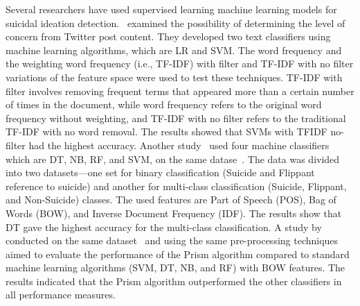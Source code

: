 \documentclass[sn-mathphys,Numbered]{sn-jnl}%
\begin{document}
Several researchers have used supervised learning machine learning models for suicidal ideation detection.~\citet{word2ODEA2015183} examined the possibility of determining the level of concern from Twitter post content. They developed two text classifiers using machine learning algorithms, which are LR and SVM. The word frequency and the weighting word frequency (i.e., TF-IDF) with filter and TF-IDF with no filter variations of the feature space were used to test these techniques. TF-IDF with filter involves removing frequent terms that appeared more than a certain number of times in the document, while word frequency refers to the original word frequency without weighting, and TF-IDF with no filter refers to the traditional TF-IDF with no word removal. The results showed that SVMs with TFIDF no-filter had the highest accuracy. Another study~\cite{33n8527039} used four machine classifiers which are DT, NB, RF, and SVM, on the same datase~\cite{32n10.1145/2700171.2791023}. The data was divided into two datasets—one set for binary classification (Suicide and Flippant reference to suicide) and another for multi-class classification (Suicide, Flippant, and Non-Suicide) classes. The used features are Part of Speech (POS), Bag of Words (BOW), and Inverse Document Frequency (IDF). The results show that DT gave the highest accuracy for the multi-class classification. 
A study by~\citet{26chiroma2018suiciderelated} conducted on the same dataset~\cite{32n10.1145/2700171.2791023} and using the same pre-processing techniques aimed to evaluate the performance of the Prism algorithm compared to standard machine learning algorithms (SVM, DT, NB, and RF) with BOW features. The results indicated that the Prism algorithm outperformed the other classifiers in all performance measures.
\end{document}
